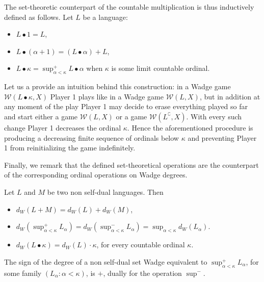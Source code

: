 The set-theoretic counterpart of the countable multiplication is thus  inductively defined as follows. 
Let $L$ be a language: 
\begin{itemize}
\item $L \bullet 1 = L$, 
\item $L \bullet (\alpha + 1) = (L \bullet \alpha)+L$, 
\item $L \bullet \kappa = \sup^+_{\alpha < \kappa} L \bullet \alpha$ when $\kappa$  is some limit countable ordinal.
\end{itemize}

Let us a provide an intuition behind this construction:  in a Wadge game $\mathcal{W}(L\bullet \kappa, X)$ Player 1 plays like in a Wadge game $\mathcal{W}(L, X)$, but in addition at any moment of the play Player 1 may decide to erase everything played so far and start either a game $\mathcal{W}(L, X)$ or a game $\mathcal{W}(L^\complement, X)$. 
With every such change Player 1 decreases the ordinal $\kappa$. Hence the aforementioned procedure is producing a decreasing finite sequence of ordinals below $\kappa$ and preventing Player 1 from reinitializing the game indefinitely.

Finally, we remark that  the defined set-theoretical operations are the counterpart of the corresponding ordinal operations on Wadge degrees.

\begin{lemma}
\label{r_mult}
Let $L$ and $ M$ be two non self-dual languages. Then 
\begin{itemize}
\item $d_W(L+M)=d_W(L)+d_W(M)$, 
\item$d_W(\sup^+ _{\alpha < \kappa} L_\alpha)= d_W(\sup^- _{\alpha < \kappa} L_\alpha)=\sup_{\alpha < \kappa}d_W( L_\alpha)$.
\item $d_W(L \bullet \kappa)= d_W(L) \cdot \kappa$, for every countable ordinal $\kappa$.
\end{itemize}
\end{lemma}

The sign of the degree of a non self-dual set Wadge equivalent 
to $\sup^+ _{\alpha < \kappa} L_\alpha$, for some   family $(L_\alpha: \alpha < \kappa)$, is $+$, dually for the operation $\sup^-$. 


